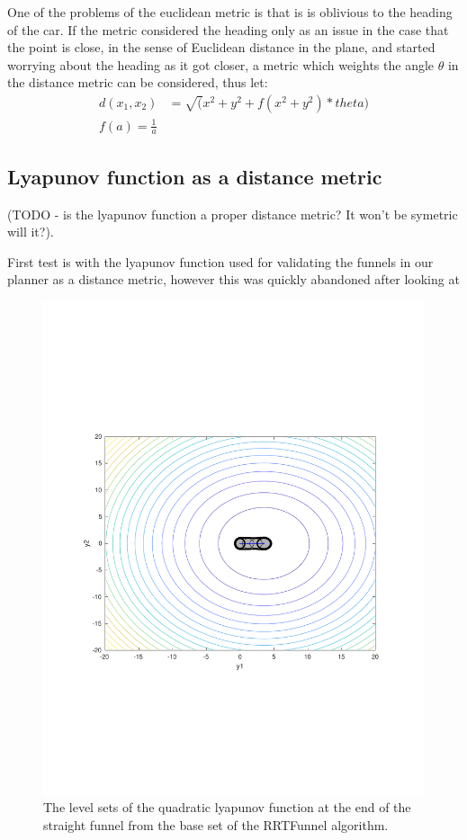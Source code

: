 One of the problems of the euclidean metric is that is is oblivious to the
heading of the car. If the metric considered the heading only as an issue in the
case that the point is close, in the sense of Euclidean distance in the plane,
and started worrying about the heading as it got closer, a metric which weights
the angle \(\theta\) in the distance metric can be considered, thus let:
\begin{align}
  d(x_1,x_2) &= \sqrt(x^2 + y^2 + f(x^2 + y^2)*theta) \\
  f(a) = \frac{1}{a}
\end{align}

\subsection{Lyapunov function as a distance metric}
(TODO - is the lyapunov function a proper distance metric? It won't be symetric
will it?).

First test is with the lyapunov function used for validating the funnels in our
planner as a distance metric, however this was quickly abandoned after looking
at
\begin{figure}
  \includegraphics[scale=.5]{figures/rrtfunnel/straight-funnel-lyapunov-level-sets}
  \caption{The level sets of the quadratic lyapunov function at the end of the
    straight funnel from the base set of the RRTFunnel algorithm.}
\end{figure}



